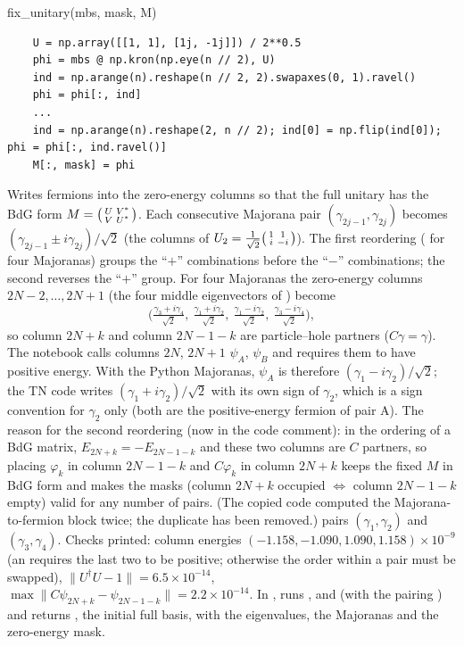 \begin{function}{fix\_unitary(mbs, mask, M)}
\begin{Verbatim}
    U = np.array([[1, 1], [1j, -1j]]) / 2**0.5
    phi = mbs @ np.kron(np.eye(n // 2), U)
    ind = np.arange(n).reshape(n // 2, 2).swapaxes(0, 1).ravel()
    phi = phi[:, ind]
    ...
    ind = np.arange(n).reshape(2, n // 2); ind[0] = np.flip(ind[0]); phi = phi[:, ind.ravel()]
    M[:, mask] = phi
\end{Verbatim}
Writes fermions into the zero-energy columns so that the full unitary has the BdG form $M = \begin{psmallmatrix}U & V^*\\ V & U^*\end{psmallmatrix}$.
Each consecutive Majorana pair $(\gamma_{2j-1},\gamma_{2j})$ becomes $(\gamma_{2j-1}\pm i\gamma_{2j})/\sqrt2$ (the columns of
$U_2 = \tfrac1{\sqrt2}\begin{psmallmatrix}1&1\\ i&-i\end{psmallmatrix}$). The first reordering (\code{[0,2,1,3]} for four Majoranas) groups
the ``$+$'' combinations before the ``$-$'' combinations; the second reverses the ``$+$'' group. For four Majoranas the zero-energy columns
$2N-2,\dots,2N+1$ (the four middle eigenvectors of ) become
\[
\bigl(\tfrac{\gamma_3+i\gamma_4}{\sqrt2},\ \tfrac{\gamma_1+i\gamma_2}{\sqrt2},\ \tfrac{\gamma_1-i\gamma_2}{\sqrt2},\ \tfrac{\gamma_3-i\gamma_4}{\sqrt2}\bigr),
\]
so column $2N+k$ and column $2N-1-k$ are particle--hole partners ($C\gamma = \gamma$). The notebook calls columns $2N$, $2N+1$ $\psi_A$, $\psi_B$
and requires them to have positive energy. With the Python Majoranas, $\psi_A$ is therefore $(\gamma_1 - i\gamma_2)/\sqrt2$; the TN code writes
$(\gamma_1+i\gamma_2)/\sqrt2$ with its own sign of $\gamma_2$, which is a sign convention for $\gamma_2$ only (both are the positive-energy
fermion of pair A). The reason for the second reordering (now in the code comment): in the  ordering of a BdG matrix,
$E_{2N+k}=-E_{2N-1-k}$ and these two columns are $C$ partners, so placing $\varphi_k$ in column $2N-1-k$ and $C\varphi_k$ in column $2N+k$ keeps
the fixed $M$ in BdG form and makes the masks (column $2N+k$ occupied $\Leftrightarrow$ column $2N-1-k$ empty) valid for any number of pairs.
(The copied code computed the Majorana-to-fermion block twice; the duplicate has been removed.) 
pairs $(\gamma_1,\gamma_2)$ and $(\gamma_3,\gamma_4)$. Checks printed: column energies $(-1.158, -1.090, 1.090, 1.158)\times10^{-9}$ (an
 requires the last two to be positive; otherwise the order within a pair must be swapped), $\|U^\dagger U - 1\| = 6.5\times10^{-14}$,
$\max\|C\psi_{2N+k} - \psi_{2N-1-k}\| = 2.2\times10^{-14}$. In ,  runs ,  and  (with the pairing ) and returns , the initial full basis, with the eigenvalues, the Majoranas and the zero-energy mask.
\end{function}

